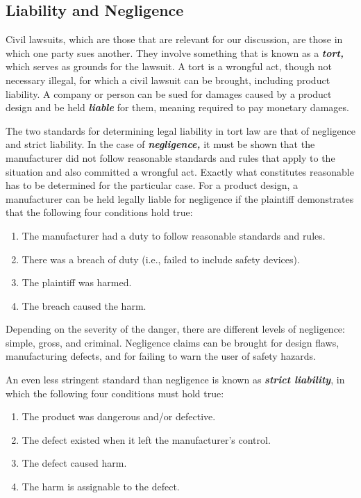 \subsection{Liability and Negligence}
\label{subsection:liability-and-negligence}

Civil lawsuits, which are those that are relevant for our discussion,
are those in which one party sues another. They involve something that
is known as a \emph{\textbf{tort,}} which serves as grounds for the
lawsuit. A tort is a wrongful act, though not necessary illegal, for
which a civil lawsuit can be brought, including product liability. A
company or person can be sued for damages caused by a product design and
be held \emph{\textbf{liable}} for them, meaning required to pay
monetary damages.

The two standards for determining legal liability in tort law are that
of negligence and strict liability. In the case of
\emph{\textbf{negligence,}} it must be shown that the manufacturer did
not follow reasonable standards and rules that apply to the situation
and also committed a wrongful act. Exactly what constitutes reasonable
has to be determined for the particular case. For a product design, a
manufacturer can be held legally liable for negligence if the plaintiff
demonstrates that the following four conditions hold true:

\begin{enumerate}
\def\labelenumi{\arabic{enumi}.}
\item
  The manufacturer had a duty to follow reasonable standards and rules.
\item
  There was a breach of duty (i.e., failed to include safety devices).
\item
  The plaintiff was harmed.
\item
  The breach caused the harm.
\end{enumerate}

Depending on the severity of the danger, there are different levels of
negligence: simple, gross, and criminal. Negligence claims can be
brought for design flaws, manufacturing defects, and for failing to warn
the user of safety hazards.

An even less stringent standard than negligence is known as
\emph{\textbf{strict liability}}, in which the following four conditions
must hold true:

\begin{enumerate}
\def\labelenumi{\arabic{enumi}.}
\item
  The product was dangerous and/or defective.
\item
  The defect existed when it left the manufacturer's control.
\item
  The defect caused harm.
\item
  The harm is assignable to the defect.
\end{enumerate}

